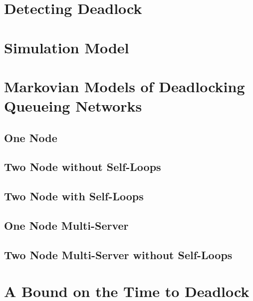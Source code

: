 \documentclass{article}
\begin{document}
\section{Detecting Deadlock}\label{sec:detectingdeadlock}

\section{Simulation Model}\label{sec:simulation}

\section{Markovian Models of Deadlocking Queueing Networks}\label{sec:markovmodels}

\subsection{One Node}

\subsection{Two Node without Self-Loops}

\subsection{Two Node with Self-Loops}

\subsection{One Node Multi-Server}

\subsection{Two Node Multi-Server without Self-Loops}

\section{A Bound on the Time to Deadlock}\label{sec:bound}



\end{document}
